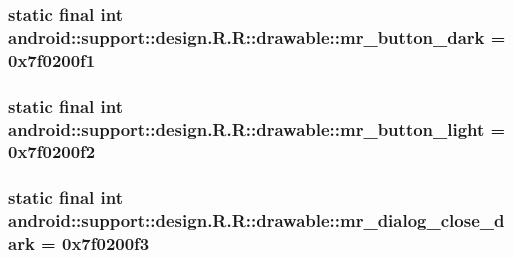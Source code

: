\hypertarget{classandroid_1_1support_1_1design_1_1_r_1_1drawable_c4020224f83c41d2ad951be1d81eeedc}{
\subsubsection[{mr\_\-button\_\-dark}]{\setlength{\rightskip}{0pt plus 5cm}static final int android::support::design.R.R::drawable::mr\_\-button\_\-dark = 0x7f0200f1}}
\label{classandroid_1_1support_1_1design_1_1_r_1_1drawable_c4020224f83c41d2ad951be1d81eeedc}


\hypertarget{classandroid_1_1support_1_1design_1_1_r_1_1drawable_dd322f17f13db9f09b7504f7cefa210b}{
\subsubsection[{mr\_\-button\_\-light}]{\setlength{\rightskip}{0pt plus 5cm}static final int android::support::design.R.R::drawable::mr\_\-button\_\-light = 0x7f0200f2}}
\label{classandroid_1_1support_1_1design_1_1_r_1_1drawable_dd322f17f13db9f09b7504f7cefa210b}


\hypertarget{classandroid_1_1support_1_1design_1_1_r_1_1drawable_f9a9f166536d83f3fb5e0c10861097c4}{
\subsubsection[{mr\_\-dialog\_\-close\_\-dark}]{\setlength{\rightskip}{0pt plus 5cm}static final int android::support::design.R.R::drawable::mr\_\-dialog\_\-close\_\-dark = 0x7f0200f3}}
\label{classandroid_1_1support_1_1design_1_1_r_1_1drawable_f9a9f166536d83f3fb5e0c10861097c4}


